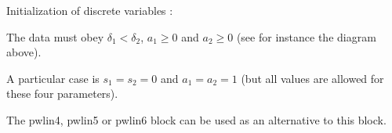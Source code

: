 Initialization of discrete variables :

\hspace*{20ex}\begin{minipage}[t]{15cm}
\begin{algorithmic} 
\ELSE
\ENDIF
\end{algorithmic}
\end{minipage}

\vspace{2ex}
The data must obey $\delta_1 < \delta_2$, $a_1 \ge 0$ and $a_2 \ge 0$ (see for instance the diagram above).

A particular case is $s_1= s_2 = 0$ and $a_1 = a_2 = 1$ (but all values are allowed for these four parameters).

The pwlin4, pwlin5 or pwlin6 block can be used as an alternative to this block.